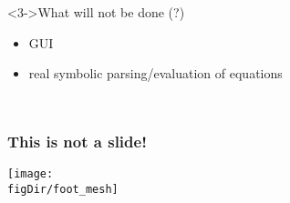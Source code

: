 \documentclass[10pt,t]{beamer}
\def\figDir{figures}
\begin{document}
\begin{frame}
\begin{columns}[t]
\begin{column}{0.55\linewidth}
\begin{block}
\begin{itemize}
\begin{itemize}
          \end{itemize}
        \end{itemize}
      \end{block}
      \begin{alertblock}<3->{What will not be done (?)}
        \begin{itemize}
        \item GUI
        \item real symbolic parsing/evaluation of equations
        \end{itemize}
      \end{alertblock}
    \end{column}
  \end{columns}
\end{frame}

\section*{}

\begin{frame}
  \frametitle{This is not a slide!}
  \vspace*{-3mm}
  \texttt{[image: \\figDir/foot\_mesh]}
\end{frame}
\end{document}
